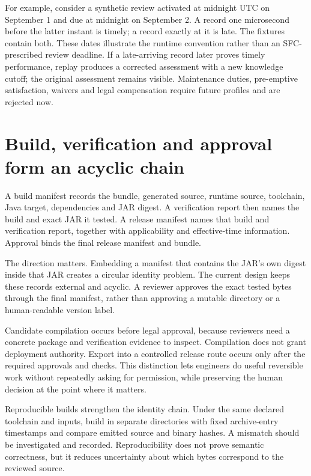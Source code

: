 For example, consider a synthetic review activated at midnight UTC on September
1 and due at midnight on September 2. A record one microsecond before the latter
instant is timely; a record exactly at it is late. The fixtures contain both.
These dates illustrate the runtime convention rather than an SFC-prescribed
review deadline. If a late-arriving record later proves timely performance,
replay produces a corrected assessment with a new knowledge cutoff; the original
assessment remains visible. Maintenance duties, pre-emptive satisfaction,
waivers and legal compensation require future profiles and are rejected now.

\section{Build, verification and approval form an acyclic chain}
\label{merge:M07:12}


A build manifest records the bundle, generated source, runtime source, toolchain,
Java target, dependencies and JAR digest. A verification report then names the
build and exact JAR it tested. A release manifest names that build and verification
report, together with applicability and effective-time information. Approval
binds the final release manifest and bundle.

The direction matters. Embedding a manifest that contains the JAR's own digest
inside that JAR creates a circular identity problem. The current design keeps
these records external and acyclic. A reviewer approves the exact tested bytes
through the final manifest, rather than approving a mutable directory or a
human-readable version label.


Candidate compilation occurs before legal approval, because reviewers need a
concrete package and verification evidence to inspect. Compilation does not grant
deployment authority. Export into a controlled release route occurs only after
the required approvals and checks. This distinction lets engineers do useful
reversible work without repeatedly asking for permission, while preserving the
human decision at the point where it matters.

Reproducible builds strengthen the identity chain. Under the same declared
toolchain and inputs, build in separate directories with fixed archive-entry
timestamps and compare emitted source and binary hashes. A mismatch should be
investigated and recorded. Reproducibility does not prove semantic correctness,
but it reduces uncertainty about which bytes correspond to the reviewed source.

